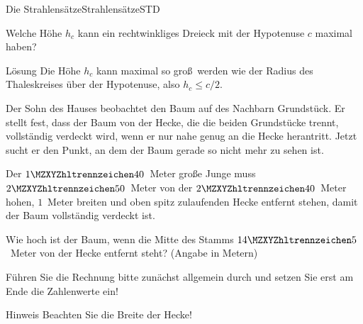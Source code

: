 \begin{MXContent}{Die Strahlens\"atze}{Strahlens\"atze}{STD}
\begin{MExercise}
Welche H\"ohe $h_c$ kann ein rechtwinkliges Dreieck mit der Hypotenuse $c$ maximal haben?

\begin{MHint}{L\"osung}
Die H\"ohe $h_c$ kann maximal so gro\ss\ werden wie der Radius des Thaleskreises \"uber der Hypotenuse, also $h_c\leq c/2$.
\end{MHint}
\end{MExercise}

\end{MXContent}

\begin{MExercises}
\begin{MExercise}
Der Sohn des Hauses beobachtet den Baum auf des Nachbarn Grundst\"uck.
Er stellt fest, dass der Baum von der Hecke, die die beiden Grundst\"ucke trennt,
vollst\"andig verdeckt wird, wenn er nur nahe genug an die Hecke herantritt.
Jetzt sucht er den Punkt, an dem der Baum gerade so nicht mehr zu sehen ist.

Der $\MZahl{1}{40}$~Meter gro\ss e Junge muss $\MZahl{2}{50}$~Meter von der $\MZahl{2}{40}$~Meter hohen, $1$~Meter breiten
und oben spitz zulaufenden Hecke
entfernt stehen, damit der Baum vollst\"andig verdeckt ist.

Wie hoch ist der Baum, wenn die Mitte des Stamms $\MZahl{14}{5}$~Meter von der Hecke entfernt steht?
\ifttm (Angabe in Metern) \else\relax\fi

F\"uhren Sie die Rechnung bitte zun\"achst allgemein durch und setzen Sie erst
am Ende die Zahlenwerte ein!

\begin{MHint}{Hinweis}
Beachten Sie die Breite der Hecke!
\end{MHint}


\end{MExercise}
\end{MExercises}
